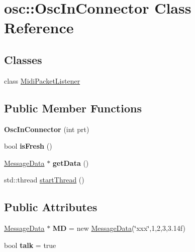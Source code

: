 \hypertarget{classosc_1_1OscInConnector}{}\section{osc\+:\+:Osc\+In\+Connector Class Reference}
\label{classosc_1_1OscInConnector}
\subsection*{Classes}
\begin{DoxyCompactItemize}
\item 
class \hyperlink{classOscInConnector_1_1MidiPacketListener}{Midi\+Packet\+Listener}
\end{DoxyCompactItemize}
\subsection*{Public Member Functions}
\begin{DoxyCompactItemize}
\item 
{\bfseries Osc\+In\+Connector} (int prt)\hypertarget{classosc_1_1OscInConnector_acb8cca9cec941690ed0dcee6611c4553}{}\label{classosc_1_1OscInConnector_acb8cca9cec941690ed0dcee6611c4553}

\item 
bool {\bfseries is\+Fresh} ()\hypertarget{classosc_1_1OscInConnector_a6603048c9ba0e9356a8dd0f5ffc1055f}{}\label{classosc_1_1OscInConnector_a6603048c9ba0e9356a8dd0f5ffc1055f}

\item 
\hyperlink{classosc_1_1MessageData}{Message\+Data} $\ast$ {\bfseries get\+Data} ()\hypertarget{classosc_1_1OscInConnector_aa7130d46061b498d0f8648c0bd9c4146}{}\label{classosc_1_1OscInConnector_aa7130d46061b498d0f8648c0bd9c4146}

\item 
std\+::thread \hyperlink{classosc_1_1OscInConnector_af546d19cf2adc1ed7c701a4804586cb9}{start\+Thread} ()
\end{DoxyCompactItemize}
\subsection*{Public Attributes}
\begin{DoxyCompactItemize}
\item 
\hyperlink{classosc_1_1MessageData}{Message\+Data} $\ast$ {\bfseries MD} = new \hyperlink{classosc_1_1MessageData}{Message\+Data}(\char`\"{}xxx\char`\"{},1,2,3,3.\+14f)\hypertarget{classosc_1_1OscInConnector_a1fd59b88007b9942b275aaa1f6c7bbc1}{}\label{classosc_1_1OscInConnector_a1fd59b88007b9942b275aaa1f6c7bbc1}

\item 
bool {\bfseries talk} = true\hypertarget{classosc_1_1OscInConnector_a8a88a1532af47166b8e7c91da8d47662}{}\label{classosc_1_1OscInConnector_a8a88a1532af47166b8e7c91da8d47662}

\end{DoxyCompactItemize}


